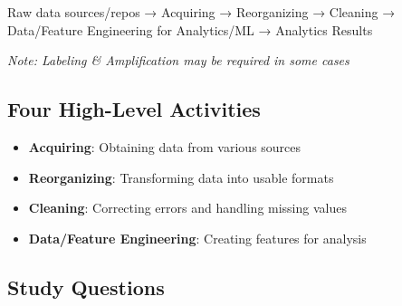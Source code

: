 \documentclass[12pt]{article}
\begin{document}
\begin{tcolorbox}[colback=green!5!white,colframe=green!75!black,title={Sourcing Process Flow}]
Raw data sources/repos → Acquiring → Reorganizing → Cleaning → Data/Feature Engineering for Analytics/ML → Analytics Results

\textit{Note: Labeling \& Amplification may be required in some cases}
\end{tcolorbox}

\subsection{Four High-Level Activities}
\begin{itemize}
    \item \textbf{Acquiring}: Obtaining data from various sources
    \item \textbf{Reorganizing}: Transforming data into usable formats
    \item \textbf{Cleaning}: Correcting errors and handling missing values
    \item \textbf{Data/Feature Engineering}: Creating features for analysis
\end{itemize}

\subsection{Study Questions}
\end{document}
